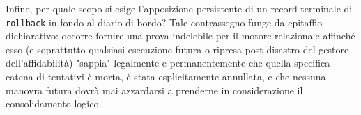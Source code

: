 Infine, per quale scopo si esige l'apposizione persistente di un record terminale di \texttt{rollback} in fondo al diario di bordo? Tale contrassegno funge da epitaffio dichiarativo: occorre fornire una prova indelebile per il motore relazionale affinché esso (e soprattutto qualsiasi esecuzione futura o ripresa post-disastro del gestore dell'affidabilità) "sappia" legalmente e permanentemente che quella specifica catena di tentativi è morta, è stata esplicitamente annullata, e che nessuna manovra futura dovrà mai azzardarsi a prenderne in considerazione il consolidamento logico.
